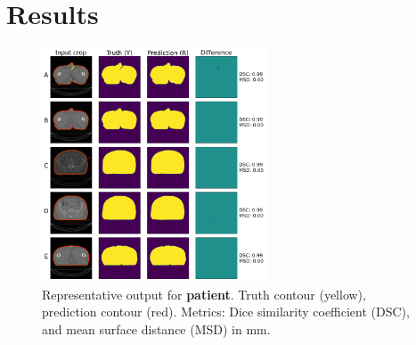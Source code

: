 \documentclass[9pt]{beamer}
\begin{document}

\section{Results}
% 
%

  \begin{frame}{}
  \begin{figure}
    \includegraphics[width=0.60\textwidth]{images/prostate_patient}
    \caption{Representative output for \textbf{patient}. Truth contour (yellow),
      prediction contour (red). Metrics: Dice similarity coefficient (DSC), and
      mean surface distance (MSD) in mm.}
  \end{figure}
\end{frame}
\end{document}
